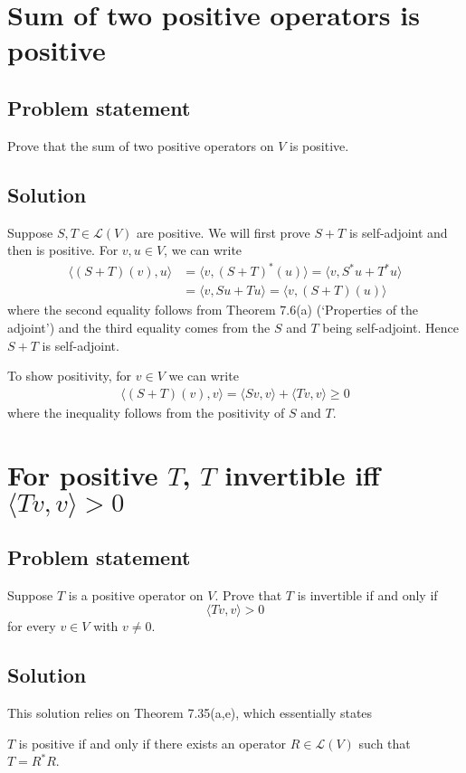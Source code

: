 \documentclass{article}
\begin{document}
\section{Sum of two positive operators is positive}
\subsection*{Problem statement}
Prove that the sum of two positive operators on $V$ is positive.

\subsection*{Solution}
Suppose $S,T\in\mathcal{L}(V)$ are positive. We will first prove $S+T$ is self-adjoint and then is positive. For $v,u\in V$, we can write
\begin{align*}
    \langle (S+T)(v),u\rangle&=\langle v,(S+T)^*(u)\rangle=\langle v,S^*u+T^*u\rangle\\
    &=\langle v,Su+Tu\rangle=\langle v,(S+T)(u)\rangle
\end{align*}
where the second equality follows from Theorem 7.6(a) (`Properties of the adjoint') and the third equality comes from the $S$ and $T$ being self-adjoint. Hence $S+T$ is self-adjoint.

To show positivity, for $v\in V$ we can write
\begin{align*}
    \langle (S+T)(v),v\rangle = \langle Sv,v\rangle+\langle Tv,v\rangle\geq 0
\end{align*}
where the inequality follows from the positivity of $S$ and $T$.

\clearpage

\renewcommand{\thesection}{7}
\section{For positive $T$, $T$ invertible iff $\langle Tv,v\rangle > 0$}
\subsection*{Problem statement}
Suppose $T$ is a positive operator on $V$. Prove that $T$ is invertible if and only if
\[\langle Tv,v\rangle > 0\]
for every $v\in V$ with $v\neq 0$.

\subsection*{Solution}
This solution relies on Theorem 7.35(a,e), which essentially states 
\begin{displayquote}
$T$ is positive if and only if there exists an operator $R\in\mathcal{L}(V)$ such that $T=R^*R$.
\end{displayquote}
\end{document}
